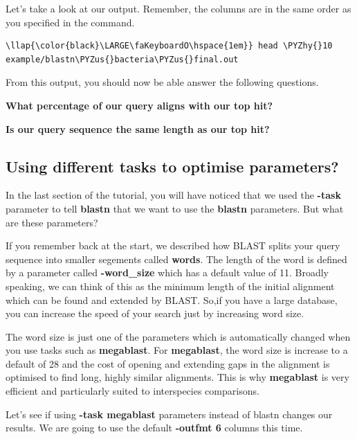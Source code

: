 \documentclass[11pt]{article}
\def\PYZus{\char`\_}
\def\PYZhy{\char`\-}
\begin{document}
    Let's take a look at our output. Remember, the columns are in the same
order as you specified in the command.

\begin{terminalinput}
\begin{Verbatim}[commandchars=\\\{\}]
\llap{\color{black}\LARGE\faKeyboardO\hspace{1em}} head \PYZhy{}10 example/blastn\PYZus{}bacteria\PYZus{}final.out
\end{Verbatim}
\end{terminalinput}

    From this output, you should now be able answer the following questions.

\textbf{What percentage of our query aligns with our top hit?}

\textbf{Is our query sequence the same length as our top hit?}

    \hypertarget{using-different-tasks-to-optimise-parameters}{%
\subsection{Using different tasks to optimise
parameters?}\label{using-different-tasks-to-optimise-parameters}}

    In the last section of the tutorial, you will have noticed that we used
the \textbf{-task} parameter to tell \textbf{blastn} that we want to use
the \textbf{blastn} parameters. But what are these parameters?

If you remember back at the start, we described how BLAST splits your
query sequence into smaller segements called \textbf{words}. The length
of the word is defined by a parameter called \textbf{-word\_size} which
has a default value of 11. Broadly speaking, we can think of this as the
minimum length of the initial alignment which can be found and extended
by BLAST. So,if you have a large database, you can increase the speed of
your search just by increasing word size.

The word size is just one of the parameters which is automatically
changed when you use tasks such as \textbf{megablast}. For
\textbf{megablast}, the word size is increase to a default of 28 and the
cost of opening and extending gaps in the alignment is optimised to find
long, highly similar alignments. This is why \textbf{megablast} is very
efficient and particularly suited to interspecies comparisons.

Let's see if using \textbf{-task megablast} parameters instead of blastn
changes our results. We are going to use the default \textbf{-outfmt 6}
columns this time.
\end{document}
